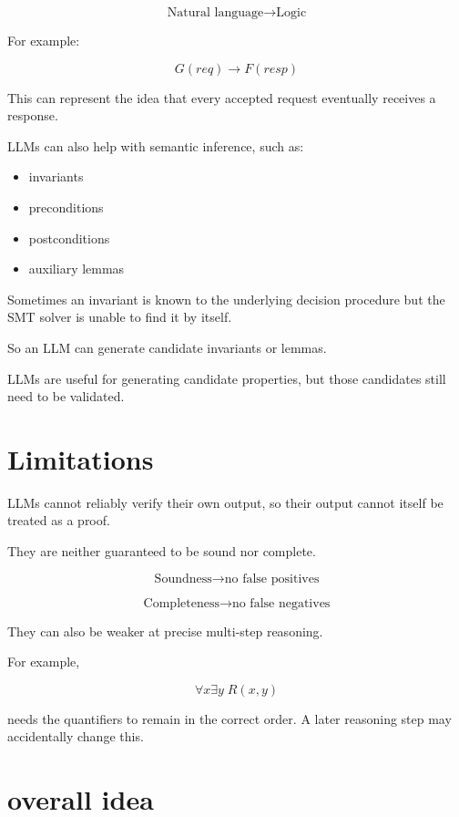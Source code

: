 \documentclass[11pt]{book}
\begin{document}
\[
\text{Natural language}
\rightarrow
\text{Logic}
\]

For example:

\[
G(req) \rightarrow F(resp)
\]

This can represent the idea that every accepted request
eventually receives a response.

LLMs can also help with semantic inference, such as:

\begin{itemize}
    \item invariants
    \item preconditions
    \item postconditions
    \item auxiliary lemmas
\end{itemize}

Sometimes an invariant is known to the underlying
decision procedure but the SMT solver is unable to
find it by itself.

So an LLM can generate candidate invariants or lemmas.

\begin{ppkey}
LLMs are useful for generating candidate properties,
but those candidates still need to be validated.
\end{ppkey}

\section{Limitations}

LLMs cannot reliably verify their own output,
so their output cannot itself be treated as a proof.

They are neither guaranteed to be sound nor complete.

\[
\text{Soundness}
\rightarrow
\text{no false positives}
\]

\[
\text{Completeness}
\rightarrow
\text{no false negatives}
\]

They can also be weaker at precise multi-step reasoning.

For example,

\[
\forall x\exists y\;R(x,y)
\]

needs the quantifiers to remain in the correct order.
A later reasoning step may accidentally change this.

\section{overall idea}
\end{document}
